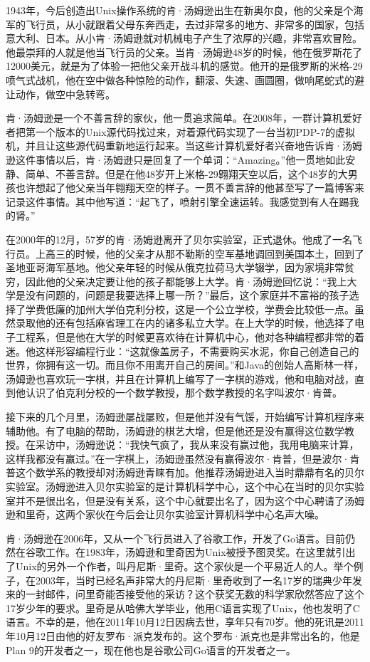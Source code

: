 \documentclass[
  letterpaper,
  DIV=11,
  numbers=noendperiod]{scrreprt}
\begin{document}
1943年，今后创造出Unix操作系统的肯·汤姆逊出生在新奥尔良，他的父亲是个海军的飞行员，从小就跟着父母东奔西走，去过非常多的地方、非常多的国家，包括意大利、日本。从小肯·汤姆逊就对机械电子产生了浓厚的兴趣，非常喜欢冒险。他最崇拜的人就是他当飞行员的父亲。当肯·汤姆逊48岁的时候，他在俄罗斯花了12000美元，就是为了体验一把他父亲开战斗机的感觉。他开的是俄罗斯的米格-29喷气式战机，他在空中做各种惊险的动作，翻滚、失速、画圆圈，做响尾蛇式的避让动作，做空中急转弯。

肯·汤姆逊是一个不善言辞的家伙，他一贯追求简单。在2008年，一群计算机爱好者把第一个版本的Unix源代码找过来，对着源代码实现了一台当初PDP-7的虚拟机，并且让这些源代码重新地运行起来。当这些计算机爱好者兴奋地告诉肯·汤姆逊这件事情以后，肯·汤姆逊只是回复了一个单词：``Amazing。''他一贯地如此安静、简单、不善言辞。但是在他48岁开上米格-29翱翔天空以后，这个48岁的大男孩也许想起了他父亲当年翱翔天空的样子。一贯不善言辞的他甚至写了一篇博客来记录这件事情。其中他写道：``起飞了，喷射引擎全速运转。我感觉到有人在踢我的肾。''

在2000年的12月，57岁的肯·汤姆逊离开了贝尔实验室，正式退休。他成了一名飞行员。上高三的时候，他的父亲才从那不勒斯的空军基地调回到美国本土，回到了圣地亚哥海军基地。他父亲年轻的时候从俄克拉荷马大学辍学，因为家境非常贫穷，因此他的父亲决定要让他的孩子都能够上大学。肯·汤姆逊回忆说：``我上大学是没有问题的，问题是我要选择上哪一所？''最后，这个家庭并不富裕的孩子选择了学费低廉的加州大学伯克利分校，这是一个公立学校，学费会比较低一点。虽然录取他的还有包括麻省理工在内的诸多私立大学。在上大学的时候，他选择了电子工程系，但是他在大学的时候更喜欢待在计算机中心，他对各种编程都非常的着迷。他这样形容编程行业：``这就像盖房子，不需要购买水泥，你自己创造自己的世界，你拥有这一切。而且你不用离开自己的房间。''和Java的创始人高斯林一样，汤姆逊也喜欢玩一字棋，并且在计算机上编写了一字棋的游戏，他和电脑对战，直到他认识了伯克利分校的一个数学教授，那个数学教授的名字叫波尔·肯普。

接下来的几个月里，汤姆逊屡战屡败，但是他并没有气馁，开始编写计算机程序来辅助他。有了电脑的帮助，汤姆逊的棋艺大增，但是他还是没有赢得这位数学教授。在采访中，汤姆逊说：``我快气疯了，我从来没有赢过他，我用电脑来计算，这样我都没有赢过。''在一字棋上，汤姆逊虽然没有赢得波尔·肯普，但是波尔·肯普这个数学系的教授却对汤姆逊青睐有加。他推荐汤姆逊进入当时鼎鼎有名的贝尔实验室。汤姆逊进入贝尔实验室的是计算机科学中心，这个中心在当时的贝尔实验室并不是很出名，但是没有关系，这个中心就要出名了，因为这个中心聘请了汤姆逊和里奇，这两个家伙在今后会让贝尔实验室计算机科学中心名声大噪。

肯·汤姆逊在2006年，又从一个飞行员进入了谷歌工作，开发了Go语言。目前仍然在谷歌工作。在1983年，汤姆逊和里奇因为Unix被授予图灵奖。在这里就引出了Unix的另外一个作者，叫丹尼斯·里奇。这个家伙是一个平易近人的人。举个例子，在2003年，当时已经名声非常大的丹尼斯·里奇收到了一名17岁的瑞典少年发来的一封邮件，问里奇能否接受他的采访？这个获奖无数的科学家欣然答应了这个17岁少年的要求。里奇是从哈佛大学毕业，他用C语言实现了Unix，他也发明了C语言。不幸的是，他在2011年10月12日因病去世，享年只有70岁。他的死讯是2011年10月12日由他的好友罗布·派克发布的。这个罗布·派克也是非常出名的，他是Plan
9的开发者之一，现在他也是谷歌公司Go语言的开发者之一。
\end{document}
